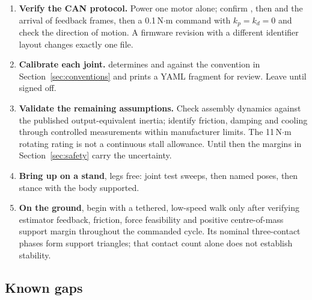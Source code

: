 \documentclass[11pt,a4paper]{article}
\begin{document}
\begin{enumerate}
\item \textbf{Verify the CAN protocol.} Power one motor alone; confirm
      , then  and the arrival of feedback
      frames, then a 0.1\,N$\cdot$m command with $k_p = k_d = 0$ and check the
      direction of motion. A firmware revision with a different identifier
      layout changes exactly one file.
\item \textbf{Calibrate each joint.}  determines  and 
      against the convention in Section~\ref{sec:conventions} and prints a YAML
      fragment for review. Leave  until signed off.
\item \textbf{Validate the remaining assumptions.} Check assembly dynamics
      against the published output-equivalent inertia; identify friction, damping
      and cooling through controlled measurements within manufacturer limits.
      The 11\,N$\cdot$m rotating rating is not a continuous stall allowance.
      Until then the margins in
      Section~\ref{sec:safety} carry the uncertainty.
\item \textbf{Bring up on a stand}, legs free: joint test sweeps, then named
      poses, then stance with the body supported.
\item \textbf{On the ground}, begin with a tethered, low-speed walk only after
      verifying estimator feedback, friction, force feasibility and positive
      centre-of-mass support margin throughout the commanded cycle. Its nominal
      three-contact phases form support triangles; that contact count alone does
      not establish stability.
\end{enumerate}

\subsection{Known gaps}
\label{sec:assumptions}
\end{document}
